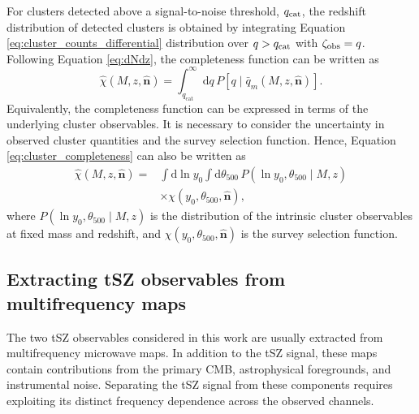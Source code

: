 \documentclass[aps,prd,twocolumn,superscriptaddress,nofootinbib,floatfix]{revtex4-2}
\begin{document}
For clusters detected above a signal-to-noise threshold, $q_{\rm cat}$, the redshift distribution of detected clusters is obtained by integrating Equation \ref{eq:cluster_counts_differential} distribution over $q>q_{\rm cat}$ with $\zeta_{\rm obs}=q$. Following Equation \ref{eq:dNdz}, the completeness function can be written as
\begin{equation}
\hat{\chi}(M,z,\hat{\bm n})
=
\int_{q_{\mathrm{cat}}}^{\infty}
\mathrm{d}q\,
P\left[
q\mid \bar q_m(M,z,\hat{\bm n})
\right].
\label{eq:cluster_completeness}
\end{equation}
Equivalently, the completeness function can be expressed in terms of the underlying cluster observables. It is necessary to consider the uncertainty in observed cluster quantities and the survey selection function. Hence, Equation \ref{eq:cluster_completeness} can also be written as
\begin{equation}
\begin{aligned}
\hat{\chi}(M,z,\hat{\bm n})
={}&
\int \mathrm{d}\ln y_{0}
\int \mathrm{d}\theta_{500}\,
P\left(
\ln y_{0},\theta_{500}\mid M,z
\right)
\\
&\times
\chi\left(
y_{0},\theta_{500},\hat{\bm n}
\right),
\end{aligned}
\label{eq:effective_completeness}
\end{equation}
where $P\left(\ln y_{0},\theta_{500}\mid M,z \right)$ is the distribution of the intrinsic cluster observables at fixed mass and redshift, and $\chi\left(
y_{0},\theta_{500},\hat{\bm n} \right)$ is the survey selection function.


\subsection{Extracting tSZ observables from multifrequency maps}
The two tSZ observables considered in this work are usually extracted from multifrequency microwave maps. In addition to the tSZ signal, these maps contain contributions from the primary CMB, astrophysical foregrounds, and instrumental noise. Separating the tSZ signal from these components requires exploiting its distinct frequency dependence across the observed channels.
\end{document}

